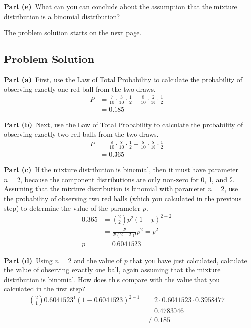 \documentclass[12pt]{article}
\theoremstyle{definition}
\begin{document}
\bigskip
\noindent
{\bf Part (e)}\ What can you can conclude about the assumption that the mixture distribution is a binomial distribution?



\bigskip
\noindent
The problem solution starts on the next page.

\newpage
\subsection*{Problem Solution}

\noindent
{\bf Part (a)}\ First, use the Law of Total Probability to calculate the probability of observing exactly one red ball from the two draws.
\begin{align*}
P &= \frac{7}{10}\cdot\frac{3}{10}\cdot \frac{1}{2} + \frac{8}{10}\cdot\frac{2}{10}\cdot \frac{1}{2}\\
&= 0.185
\end{align*}

\vspace{3.5in}
\noindent
{\bf Part (b)}\ Next, use the Law of Total Probability to calculate the probability of observing exactly two red balls from the two draws.
\begin{align*}
P &= \frac{8}{10} \cdot \frac{8}{10}\cdot \frac{1}{2} + \frac{8}{10} \cdot \frac{8}{10}\cdot \frac{1}{2}\\
&= 0.365
\end{align*}


\newpage
\noindent
{\bf Part (c)}\ If the mixture distribution is binomial, then it must have parameter $n = 2$, because the component distributions are only non-zero for 0, 1, and 2. Assuming that the  mixture distribution is binomial with parameter $n = 2$, use the probability of observing two red balls (which you calculated in the previous step) to determine the value of the parameter $p$.
\begin{align*}
0.365 &= \binom{2}{2} p^2(1 - p) ^{2-2}\\
&= \frac{2!}{2!(2-2)!}p^2 = p^2\\
p&= 0.6041523
\end{align*}

\vspace{3in}
\noindent
{\bf Part (d)}\ Using $n = 2$ and the value of $p$ that you have just calculated, calculate the value of observing exactly one ball, again assuming that the mixture distribution is binomial. How does this compare with the value that you calculated in the first step?
\begin{align*}
\binom{2}{1}0.6041523^1(1-0.6041523)^{2-1} &= 2 \cdot 0.6041523 \cdot 0.3958477\\
&= 0.4783046\\
&\neq 0.185\\
\end{align*}
\end{document}

